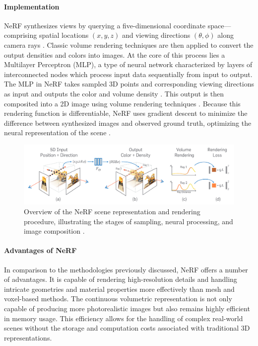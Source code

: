 \paragraph{Implementation}
NeRF synthesizes views by querying a five-dimensional coordinate space—comprising spatial locations \((x, y, z)\) and viewing directions \((\theta, \phi)\) along camera rays .
Classic volume rendering techniques are then applied to convert the output densities and colors into images.
At the core of this process lies a Multilayer Perceptron (MLP), a type of neural network characterized by layers of interconnected nodes which process input data sequentially from input to output.
The MLP in NeRF takes sampled 3D points and corresponding viewing directions as input and outputs the color and volume density  .
This output is then composited into a 2D image using volume rendering techniques  .
Because this rendering function is differentiable, NeRF uses gradient descent to minimize the difference between synthesized images and observed ground truth, optimizing the neural representation of the scene  .

\begin{figure}[h!]
  \centering
  \includegraphics[width=\textwidth]{figures/bg-nerf.png}
  \caption{Overview of the NeRF scene representation and rendering procedure, illustrating the stages of sampling, neural processing, and image composition \cite{mildenhall_nerf_2021}.}
  \label{fig:nerf-overview}
\end{figure}

\paragraph{Advantages of NeRF}
In comparison to the methodologies previously discussed, NeRF offers a number of advantages.
It is capable of rendering high-resolution details and handling intricate geometries and material properties more effectively than mesh and voxel-based methods.
The continuous volumetric representation is not only capable of producing more photorealistic images but also remains highly efficient in memory usage.
This efficiency allows for the handling of complex real-world scenes without the storage and computation costs associated with traditional 3D representations.

